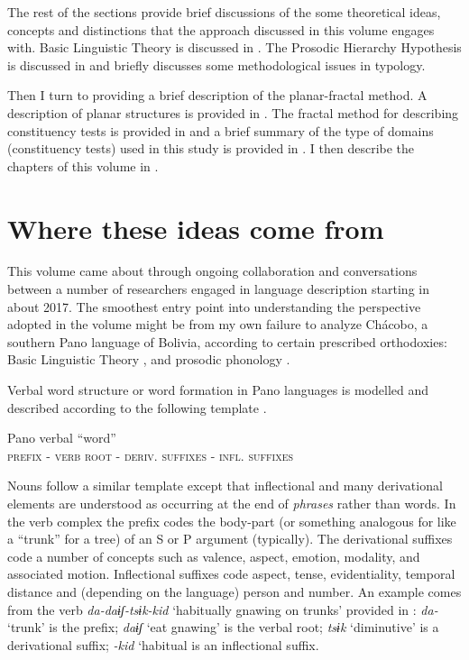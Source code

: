 \documentclass[output=paper,hidelinks]{langscibook}
\begin{document}
The rest of the sections provide brief discussions of the some theoretical ideas, concepts and distinctions that the approach discussed in this volume engages with. Basic Linguistic Theory is discussed in . The Prosodic Hierarchy Hypothesis is discussed in  and  briefly discusses some methodological issues in typology.

Then I turn to providing a brief description of the planar-fractal method. A description of planar structures is provided in . The fractal method for describing constituency tests is provided in  and a brief summary of the type of domains (constituency tests) used in this study is provided in . I then describe the chapters of this volume in .

\section{Where these ideas come from}
\label{sec:introduction}

This volume came about through ongoing collaboration and conversations between a number of researchers engaged in language description starting in about 2017. The smoothest entry point into understanding the perspective adopted in the volume might be from my own failure to analyze Chácobo, a southern Pano language of Bolivia, according to certain prescribed orthodoxies: Basic Linguistic Theory \citep{dixonaikhenvald02}, and prosodic phonology \citep{nespor2007prosodic, Anderson2005}.

Verbal word structure or word formation in Pano languages is modelled and described according to the following template \citep{loos1999pano, fleck2003grammar, valenzuela2003transitivity, fleck2013panoan, neely2019linguistic, souza2020switch}. 

\ea \label{ex:panoverbalword}
    Pano verbal ``word'' \\
    \textsc{prefix} - \textsc{verb root} - \textsc{deriv. suffixes} - \textsc{infl. suffixes}
\z 

Nouns follow a similar template except that inflectional and many derivational elements are understood as occurring at the end of \textit{phrases} rather than words. In the verb complex the prefix codes the body-part (or something analogous for like a ``trunk'' for a tree) of an S or P argument (typically). The derivational suffixes code a number of concepts such as valence, aspect, emotion, modality, and associated motion. Inflectional suffixes code aspect, tense, evidentiality, temporal distance and (depending on the language) person and number. An example comes from the verb \textit{da-daɨʃ-tsɨk-kid} `habitually gnawing on trunks' provided in : \textit{da-} `trunk' is the prefix; \textit{daɨʃ} `eat gnawing' is the verbal root; \textit{tsɨk} `diminutive' is a derivational suffix; \textit{-kid} `habitual is an inflectional suffix.
\end{document}
